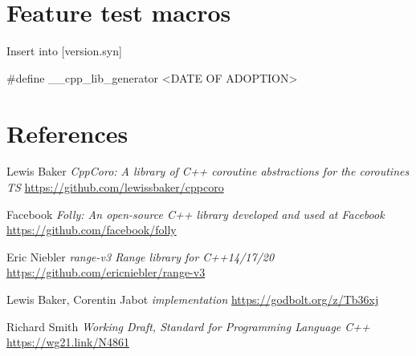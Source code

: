 \documentclass{wg21}
\begin{document}
\section{Feature test macros}

Insert into [version.syn]

\begin{addedblock}
\begin{codeblock}
    #define __cpp_lib_generator <DATE OF ADOPTION>
\end{codeblock}
\end{addedblock}
    
    
\section{References}
\renewcommand{\section}[2]{}%



\begin{thebibliography}{9}
    Lewis Baker
    \emph{CppCoro: A library of C++ coroutine abstractions for the coroutines TS}\newline
    \url{https://github.com/lewissbaker/cppcoro}
    
    Facebook
    \emph{Folly: An open-source C++ library developed and used at Facebook}\newline
    \url{https://github.com/facebook/folly}
    
    
    Eric Niebler
    \emph{range-v3 Range library for C++14/17/20}\newline
    \url{https://github.com/ericniebler/range-v3}
    
    Lewis Baker, Corentin Jabot
    \emph{ implementation}\newline
    \url{https://godbolt.org/z/Tb36xj}
    
    Richard Smith
    \emph{Working Draft, Standard for Programming Language C++}\newline
    \url{https://wg21.link/N4861}
    
    
\end{thebibliography}
    
\end{document}
